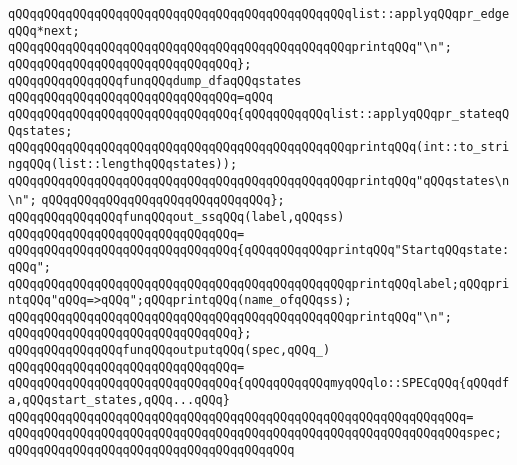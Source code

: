 \verb|qQQqqQQqqQQqqQQqqQQqqQQqqQQqqQQqqQQqqQQqqQQqqQQqlist::applyqQQqpr_edgeqQQq*next;|\newline
\verb|qQQqqQQqqQQqqQQqqQQqqQQqqQQqqQQqqQQqqQQqqQQqqQQqprintqQQq"\n";|\newline
\verb|qQQqqQQqqQQqqQQqqQQqqQQqqQQqqQQq};|\newline
\newline
\verb|qQQqqQQqqQQqqQQqfunqQQqdump_dfaqQQqstates|\newline
\verb|qQQqqQQqqQQqqQQqqQQqqQQqqQQqqQQq=qQQq|\newline
\verb|qQQqqQQqqQQqqQQqqQQqqQQqqQQqqQQq{qQQqqQQqqQQqlist::applyqQQqpr_stateqQQqstates;|\newline
\verb|qQQqqQQqqQQqqQQqqQQqqQQqqQQqqQQqqQQqqQQqqQQqqQQqprintqQQq(int::to_stringqQQq(list::lengthqQQqstates));|\newline
\verb|qQQqqQQqqQQqqQQqqQQqqQQqqQQqqQQqqQQqqQQqqQQqqQQqprintqQQq"qQQqstates\n\n";|\newline
\verb|qQQqqQQqqQQqqQQqqQQqqQQqqQQqqQQq};|\newline
\newline
\newline
\verb|qQQqqQQqqQQqqQQqfunqQQqout_ssqQQq(label,qQQqss)|\newline
\verb|qQQqqQQqqQQqqQQqqQQqqQQqqQQqqQQq=|\newline
\verb|qQQqqQQqqQQqqQQqqQQqqQQqqQQqqQQq{qQQqqQQqqQQqprintqQQq"StartqQQqstate:qQQq";|\newline
\verb|qQQqqQQqqQQqqQQqqQQqqQQqqQQqqQQqqQQqqQQqqQQqqQQqprintqQQqlabel;qQQqprintqQQq"qQQq=>qQQq";qQQqprintqQQq(name_ofqQQqss);|\newline
\verb|qQQqqQQqqQQqqQQqqQQqqQQqqQQqqQQqqQQqqQQqqQQqqQQqprintqQQq"\n";|\newline
\verb|qQQqqQQqqQQqqQQqqQQqqQQqqQQqqQQq};|\newline
\newline
\verb|qQQqqQQqqQQqqQQqfunqQQqoutputqQQq(spec,qQQq_)|\newline
\verb|qQQqqQQqqQQqqQQqqQQqqQQqqQQqqQQq=|\newline
\verb|qQQqqQQqqQQqqQQqqQQqqQQqqQQqqQQq{qQQqqQQqqQQqmyqQQqlo::SPECqQQq{qQQqdfa,qQQqstart_states,qQQq...qQQq}|\newline
\verb|qQQqqQQqqQQqqQQqqQQqqQQqqQQqqQQqqQQqqQQqqQQqqQQqqQQqqQQqqQQqqQQq=|\newline
\verb|qQQqqQQqqQQqqQQqqQQqqQQqqQQqqQQqqQQqqQQqqQQqqQQqqQQqqQQqqQQqqQQqspec;|\newline
\verb|qQQqqQQqqQQqqQQqqQQqqQQqqQQqqQQqqQQqqQQq|\newline
